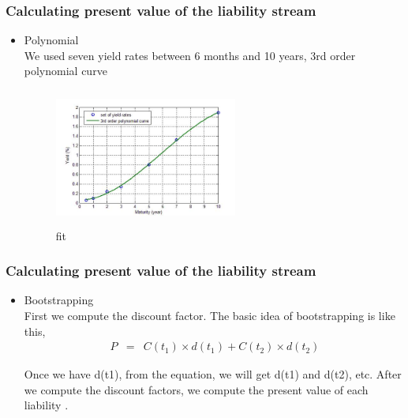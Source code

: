 \documentclass[compress,handout,10pt]{beamer}
\let\olditem\item
\renewcommand{\item}{\setlength{\itemsep}{0.5\baselineskip}\olditem}
\begin{document}
\begin{frame}
    \frametitle{Calculating present value of the liability stream}
\begin{itemize}
\item Polynomial \\
\vspace{1mm}
We used seven yield rates between 6 months and 10 years, 3rd order polynomial curve 
\begin{figure}[bottom]
    \begin{center}
        \includegraphics[width=6cm,height=4.5cm]{fit.jpg}
    \end{center}
    \caption{fit}
    \label{figure1}
\end{figure}
\end{itemize}
\end{frame}

\begin{frame}
    \frametitle{Calculating present value of the liability stream}
\begin{itemize}
\item Bootstrapping \\
First we compute the discount factor. The basic idea of bootstrapping is like this,\\
\begin{eqnarray}
  \ P &=& C(t_1) \times d(t_1) + C(t_2) \times d(t_2)
\end{eqnarray}

Once we have d(t1), from the equation, we will get d(t1) and d(t2), etc. After we compute the discount factors, we compute the present value of each liability .
\end{itemize}
\end{frame}
\end{document}
